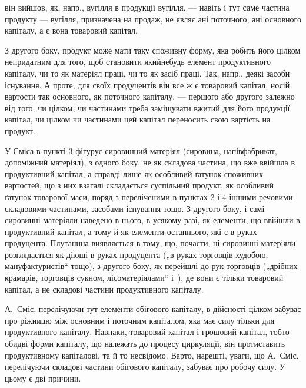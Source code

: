 \parcont{}  %
він вийшов, як, напр., вугілля в продукції вугілля, — навіть і тут саме
частина продукту — вугілля, призначена на продаж, не являє ані поточного,
ані основного капіталу, а є вона товаровий капітал.

З другого боку, продукт може мати таку споживну форму, яка робить
його цілком непридатним для того, щоб становити якийнебудь елемент
продуктивного капіталу, чи то як матеріял праці, чи то як засіб
праці. Так, напр., деякі засоби існування. А проте, для своїх продуцентів
він все ж є товаровий капітал, носій вартости так основного, як поточного
капіталу, — першого або другого залежно від того, чи цілком,
чи частинами треба заміщувати вжитий для його продукції капітал, чи
цілком чи частинами цей капітал переносить свою вартість на продукт.

У Сміса в пункті 3 фігурує сировинний матеріял (сировина, напівфабрикат,
допоміжний матеріял), з одного боку, не як складова частина,
що вже ввійшла в продуктивний капітал, а справді лише як особливий ґатунок
споживних вартостей, що з них взагалі складається суспільний
продукт, як особливий ґатунок товарової маси, поряд з переліченими в
пунктах 2 і 4 іншими речовими складовими частинами, засобами існування
тощо. З другого боку, і самі сировинні матеріяли наведено в нього, в
усякому разі, як елементи, що ввійшли в продуктивний капітал, а тому й
як елементи останнього, які є в руках продуцента. Плутанина виявляється в
тому, що, почасти, ці сировинні матеріяли розглядається як діющі в руках
продуцента („в руках торговців худобою, мануфактуристів“ тощо), з
другого боку, як перейшлі до рук торговців („дрібних крамарів, торговців
сукном, лісоматеріялами“ і~), де вони є тільки товаровий капітал, а
не складові частини продуктивного капіталу.

А.~Сміс, перелічуючи тут елементи обігового капіталу, в дійсності цілком
забуває про ріжницю між основним і поточним капіталом, яка має
силу тільки для продуктивного капіталу. Навпаки, товаровий капітал і
грошовий капітал, тобто обидві форми капіталу, що належать до процесу
циркуляції, він протиставить продуктивному капіталові, та й то несвідомо.
Варто, нарешті, уваги, що А.~Сміс, перелічуючи складові частини обігового
капіталу, забуває про робочу силу. У цьому є дві причини.

